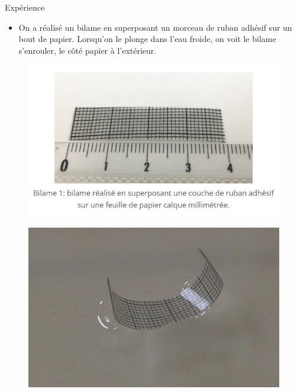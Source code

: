 \begin{frame}{Expérience}
    \begin{itemize}
        \item On a réalisé un bilame en superposant un morceau de ruban adhésif sur un bout de papier. Lorsqu'on le plonge dans l'eau froide, on voit le bilame s'enrouler, le côté papier à l'extérieur.
    \end{itemize}
    \begin{figure}
        \centering
        \includegraphics[scale=0.3]{imgs/exp1.JPG}
    \end{figure}
    \begin{figure}
        \centering
        \includegraphics[scale=0.3]{imgs/exp2.JPG}
    \end{figure}
\end{frame}

